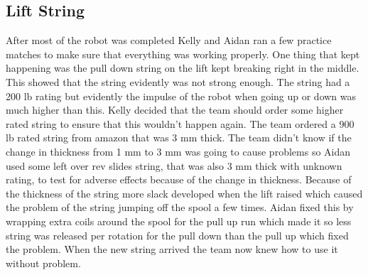\documentclass{article}
\begin{document}
\subsection{Lift String}
After most of the robot was completed Kelly and Aidan ran a few practice matches to make sure that everything was working properly. One thing that kept happening was the pull down string on the lift kept breaking right in the middle. This showed that the string evidently was not strong enough. The string had a 200 lb rating but evidently the impulse of the robot when going up or down was much higher than this. Kelly decided that the team should order some higher rated string to ensure that this wouldn't happen again. The team ordered a 900 lb rated string from amazon that was 3 mm thick. The team didn't know if the change in thickness from 1 mm  to 3 mm was going to cause problems so Aidan used some left over rev slides string, that was also 3 mm thick with unknown rating, to test for adverse effects because of the change in thickness. Because of the thickness of the string more slack developed when the lift raised which caused the problem of the string jumping off the spool a few times. Aidan fixed this by wrapping extra coils around the spool for the pull up run which made it so less string was released per rotation for the pull down than the pull up which fixed the problem. When the new string arrived the team now knew how to use it without problem.
\end{document}

